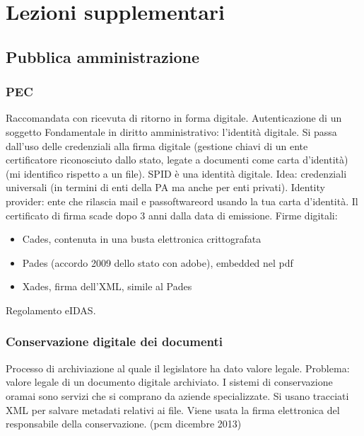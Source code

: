 

\chapter{Lezioni supplementari}

\section{Pubblica amministrazione}

\subsection{PEC}

Raccomandata con ricevuta di ritorno in forma digitale.
Autenticazione di un soggetto Fondamentale in diritto
amministrativo: l'identit\`a digitale. Si passa dall'uso delle credenziali
alla firma digitale (gestione chiavi di un ente certificatore
riconosciuto dallo stato, legate a documenti come carta d'identit\`a) (mi
identifico rispetto a un file). SPID \`e una identit\`a digitale. Idea:
credenziali universali (in termini di enti della PA ma anche per enti
privati). Identity provider: ente che rilascia mail e passoftwareord usando la
tua carta d'identit\`a. Il certificato di firma scade dopo 3 anni dalla
data di emissione. Firme digitali:

\begin{itemize}
\item
  Cades, contenuta in una busta elettronica crittografata
\item
  Pades (accordo 2009 dello stato con adobe), embedded nel pdf
\item
  Xades, firma dell'XML, simile al Pades
\end{itemize}

Regolamento eIDAS.

\subsection{Conservazione digitale dei
documenti}

Processo di archiviazione al quale il legislatore ha dato valore legale.
Problema: valore legale di un documento digitale archiviato. I sistemi
di conservazione oramai sono servizi che si comprano da aziende
specializzate. Si usano tracciati XML per salvare metadati relativi ai
file. Viene usata la firma elettronica del responsabile della
conservazione. (pcm dicembre 2013)

